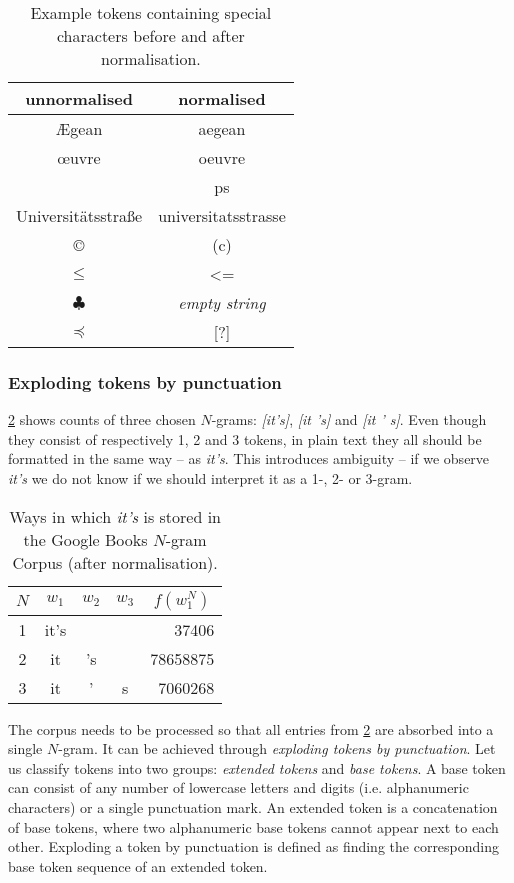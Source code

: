 \documentclass[draft]{IIBproject}
\makeatletter
\DeclareRobustCommand*{\ie}{i.e.\@\xspace}
\DeclareRobustCommand{\ngram}[1]{\emph{[#1]}}
\makeatother
\begin{document}
\begin{table}[h]
	\centering
	\begin{tabular}{c | c}
	unnormalised & normalised \\
	\hline
	Ægean & aegean \\
	œuvre & oeuvre \\
	\textsterling & ps \\
	Universitätsstraße & universitatsstrasse \\
	\copyright & (c) \\
	$\leq$ & \textless= \\
	$\clubsuit$ & \emph{empty string} \\
	$\preccurlyeq$ & [?]
	\end{tabular}
	\caption{\label{tab:normalisation_examples}Example tokens containing special characters before and after normalisation.}
\end{table}

\subsubsection{Exploding tokens by punctuation}
\label{sec:exploding_tokens}

\cref{tab:its_ngrams} shows counts of three chosen $N$-grams: \ngram{it's}, \ngram{it 's} and \ngram{it ' s}. Even though they consist of respectively 1, 2 and 3 tokens, in plain text they all should be formatted in the same way -- as \emph{it's}. This introduces ambiguity -- if we observe \emph{it's} we do not know if we should interpret it as a 1-, 2- or 3-gram.

\begin{table}[h]
	\centering
	\begin{tabular}{c | c | c | c | r}
	$N$ & $w_1$ & $w_2$ & $w_3$ & \multicolumn{1}{c}{$f(w_1^N)$} \\
	\hline
	1 & it's & & & \num{37406} \\
	2 & it & 's & & \num{78658875} \\
	3 & it & ' & s & \num{7060268}
	\end{tabular}
	\caption{\label{tab:its_ngrams}Ways in which \emph{it's} is stored in the Google Books $N$-gram Corpus (after normalisation).}
\end{table}

The corpus needs to be processed so that all entries from \cref{tab:its_ngrams} are absorbed into a single $N$-gram. It can be achieved through \emph{exploding tokens by punctuation}. Let us classify tokens into two groups: \emph{extended tokens} and \emph{base tokens}. A base token can consist of any number of lowercase letters and digits (\ie alphanumeric characters) or a single punctuation mark. An extended token is a concatenation of base tokens, where two alphanumeric base tokens cannot appear next to each other. Exploding a token by punctuation is defined as finding the corresponding base token sequence of an extended token.
\end{document}
